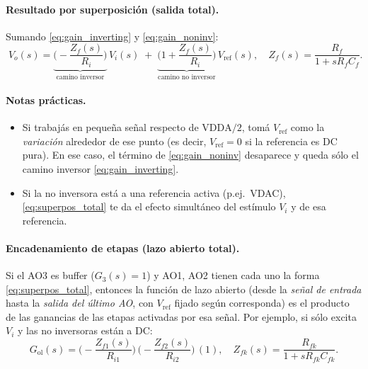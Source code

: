 \paragraph{Resultado por superposición (salida total).}
Sumando \eqref{eq:gain_inverting} y \eqref{eq:gain_noninv}:
\begin{equation}
	\boxed{\;\displaystyle
		V_o(s)
		= \underbrace{\Bigg(-\frac{Z_f(s)}{R_i}\Bigg)}_{\text{camino inversor}}\,V_i(s)
		\;+\;
		\underbrace{\Bigg(1+\frac{Z_f(s)}{R_i}\Bigg)}_{\text{camino no inversor}}\,V_{\text{ref}}(s),
		\quad
		Z_f(s)=\frac{R_f}{1+sR_fC_f}.
		\;}
	\label{eq:superpos_total}
\end{equation}

\paragraph{Notas prácticas.}
\begin{itemize}
	\item Si trabajás en pequeña señal respecto de $\text{VDDA}/2$, tomá $V_{\text{ref}}$ como la \emph{variación} alrededor de ese punto (es decir, $V_{\text{ref}}=0$ si la referencia es DC pura). En ese caso, el término de \eqref{eq:gain_noninv} desaparece y queda sólo el camino inversor \eqref{eq:gain_inverting}.
	\item Si la no inversora está a una referencia activa (p.ej.\ VDAC), \eqref{eq:superpos_total} te da el efecto simultáneo del estímulo $V_i$ y de esa referencia.
\end{itemize}

\paragraph{Encadenamiento de etapas (lazo abierto total).}
Si el AO3 es buffer ($G_3(s)=1$) y AO1, AO2 tienen cada uno la forma \eqref{eq:superpos_total}, entonces la función de lazo abierto (desde la \emph{señal de entrada} hasta la \emph{salida del último AO}, con $V_{\text{ref}}$ fijado según corresponda) es el producto de las ganancias de las etapas activadas por esa señal. Por ejemplo, si sólo excita $V_i$ y las no inversoras están a DC:
\[
G_{\text{ol}}(s)
= \Big(-\frac{Z_{f1}(s)}{R_{i1}}\Big)\,
\Big(-\frac{Z_{f2}(s)}{R_{i2}}\Big)\,
(1),
\quad
Z_{fk}(s)=\frac{R_{fk}}{1+sR_{fk}C_{fk}}.
\]
